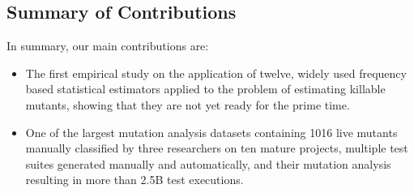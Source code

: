 \documentclass[sigconf,review,anonymous]{acmart}
\newcommand{\estimatorCount}{twelve\xspace}
\newcounter{todocounter}
\newcommand{\todo}[1]{\marginpar{$|$}\textcolor{red}{\stepcounter{todocounter}\footnote[\thetodocounter]{\textcolor{red}{\textbf{TODO }}\textit{#1}}}}
\newcommand{\Randoop}{\textsc{Randoop}\xspace}
\newcommand{\Evosuite}{\textsc{EvoSuite}\xspace}
\newcommand{\original}{\textsc{Original}\xspace}
\newcommand{\EvosuiteRandom}{\textsc{Random}\xspace}
\newcommand{\EvosuiteDynamosa}{\textsc{DynaMOSA}\xspace}
\renewcommand{\todo}[1]{}
\begin{document}
\subsection{Summary of Contributions}
In summary, our main contributions are:
\begin{itemize}
   \item The first empirical study on the application of \estimatorCount,
         widely used frequency based statistical %
         estimators applied to the problem of estimating killable mutants,
         showing that they are not yet ready for the prime time.
   \item One of the largest %
mutation analysis datasets containing 1016 live mutants manually
classified by three researchers on ten mature projects,
multiple test suites generated manually and automatically,
and their mutation analysis resulting in more than 2.5B test executions.
\end{itemize}



\end{document}
